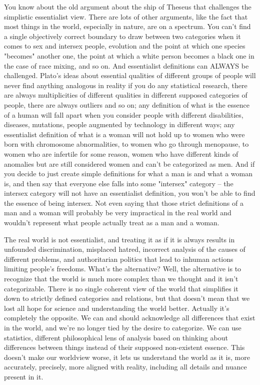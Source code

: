 \documentclass[12 pt, a4paper]{article}
\begin{document}
You know about the old argument about the ship of Theseus that challenges the simplistic essentialist view. There are lots of other arguments, like the fact that most things in the world, especially in nature, are on a spectrum. You can't find a single objectively correct boundary to draw between two categories when it comes to sex and intersex people, evolution and the point at which one species "becomes" another one, the point at which a white person becomes a black one in the case of race mixing, and so on. And essentialist definitions can ALWAYS be challenged. Plato's ideas about essential qualities of different groups of people will never find anything analogous in reality if you do any statistical research, there are always multiplicities of different qualities in different supposed categories of people, there are always outliers and so on; any definition of what is the essence of a human will fall apart when you consider people with different disabilities, diseases, mutations, people augmented by technology in different ways; any essentialist definition of what is a woman will not hold up to women who were born with chromosome abnormalities, to women who go through menopause, to women who are infertile for some reason, women who have different kinds of anomalies but are still considered women and can't be categorized as men. And if you decide to just create simple definitions for what a man is and what a woman is, and then say that everyone else falls into some "intersex" category – the intersex category will not have an essentialist definition, you won't be able to find the essence of being intersex. Not even saying that those strict definitions of a man and a woman will probably be very impractical in the real world and wouldn't represent what people actually treat as a man and a woman. 

The real world is not essentialist, and treating it as if it is always results in unfounded discrimination, misplaced hatred, incorrect analysis of the causes of different problems, and authoritarian politics that lead to inhuman actions limiting people's freedoms. What's the alternative? Well, the alternative is to recognize that the world is much more complex than we thought and it isn't categorizable. There is no single coherent view of the world that simplifies it down to strictly defined categories and relations, but that doesn't mean that we lost all hope for science and understanding the world better. Actually it's completely the opposite. We can and should acknowledge all differences that exist in the world, and we're no longer tied by the desire to categorize. We can use statistics, different philosophical lens of analysis based on thinking about differences between things instead of their supposed non-existent essence. This doesn't make our worldview worse, it lets us understand the world as it is, more accurately, precisely, more aligned with reality, including all details and nuance present in it. 
\end{document}
